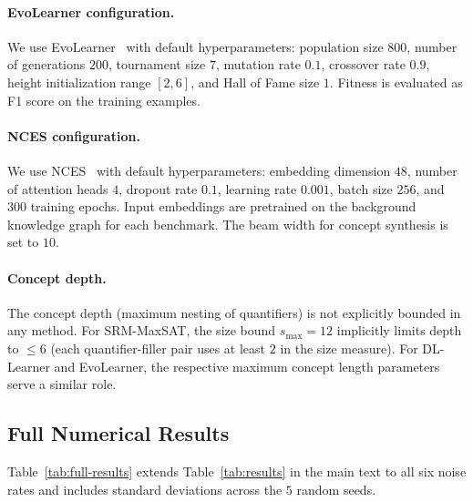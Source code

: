 \documentclass[accepted]{uai2026} %
\theoremstyle{definition}
\theoremstyle{remark}
\begin{document}
\paragraph{EvoLearner configuration.}
We use EvoLearner~\citep{DBLP:conf/www/HeindorfBDWGDN22}
with default hyperparameters: population size $800$,
number of generations $200$, tournament size $7$, mutation
rate $0.1$, crossover rate $0.9$, height initialization
range $[2, 6]$, and Hall of Fame size $1$.  Fitness is
evaluated as F1 score on the training examples.

\paragraph{NCES configuration.}
We use NCES~\citep{DBLP:conf/esws/KouagouHDN23} with
default hyperparameters: embedding dimension $48$,
number of attention heads $4$, dropout rate $0.1$,
learning rate $0.001$, batch size $256$, and $300$
training epochs.  Input embeddings are pretrained on
the background knowledge graph for each benchmark.  The
beam width for concept synthesis is set to $10$.

\paragraph{Concept depth.}
The concept depth (maximum nesting of quantifiers) is
not explicitly bounded in any method.  For SRM-MaxSAT,
the size bound $s_{\max} = 12$ implicitly limits depth
to $\leq 6$ (each quantifier-filler pair uses at least
$2$ in the size measure).  For DL-Learner and EvoLearner,
the respective maximum concept length parameters
serve a similar role.

\subsection{Full Numerical Results}\label{app:full-results}

Table~\ref{tab:full-results} extends
Table~\ref{tab:results} in the main text to all six noise rates
and includes standard deviations across the $5$ random seeds.
\end{document}
